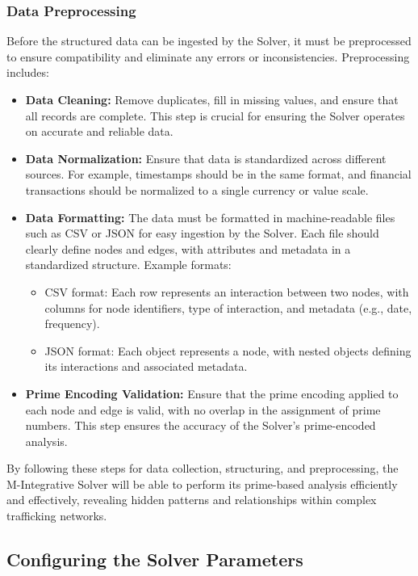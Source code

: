 \documentclass[%
 preprint, linenumbers,
 amsmath,amssymb,
 aps, physrev,
]{revtex4-2}
\begin{document}
\subsubsection{Data Preprocessing}

Before the structured data can be ingested by the Solver, it must be preprocessed to ensure compatibility and eliminate any errors or inconsistencies. Preprocessing includes:
\begin{itemize}
    \item \textbf{Data Cleaning:} Remove duplicates, fill in missing values, and ensure that all records are complete. This step is crucial for ensuring the Solver operates on accurate and reliable data.
    \item \textbf{Data Normalization:} Ensure that data is standardized across different sources. For example, timestamps should be in the same format, and financial transactions should be normalized to a single currency or value scale.
    \item \textbf{Data Formatting:} The data must be formatted in machine-readable files such as CSV or JSON for easy ingestion by the Solver. Each file should clearly define nodes and edges, with attributes and metadata in a standardized structure. Example formats:
    \begin{itemize}
        \item CSV format: Each row represents an interaction between two nodes, with columns for node identifiers, type of interaction, and metadata (e.g., date, frequency).
        \item JSON format: Each object represents a node, with nested objects defining its interactions and associated metadata.
    \end{itemize}
    \item \textbf{Prime Encoding Validation:} Ensure that the prime encoding applied to each node and edge is valid, with no overlap in the assignment of prime numbers. This step ensures the accuracy of the Solver’s prime-encoded analysis.
\end{itemize}

By following these steps for data collection, structuring, and preprocessing, the M-Integrative Solver will be able to perform its prime-based analysis efficiently and effectively, revealing hidden patterns and relationships within complex trafficking networks.

\subsection{Configuring the Solver Parameters}
\end{document}
